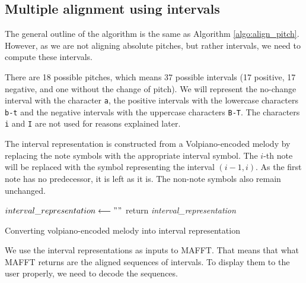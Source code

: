 \subsection{Multiple alignment using intervals}

The general outline of the algorithm is the same as Algorithm \ref{algo:align_pitch}. However, as we are not aligning absolute pitches, but rather intervals,
we need to compute these intervals.

There are 18 possible pitches, which means 37 possible intervals (17 positive, 17 negative, and one without the change of pitch). We will represent the no-change interval
with the character \verb|a|, the positive intervals with the lowercase characters \verb|b-t| and the negative intervals with the uppercase characters \verb|B-T|. The characters
\verb|i| and \verb|I| are not used for reasons explained later.

The interval representation is constructed from a Volpiano-encoded melody by replacing the note symbols with the appropriate interval symbol. The $i$-th note will be
replaced with the symbol representing the interval $(i-1, i)$. As the first note has no predecessor, it is left as it is. The non-note symbols also remain unchanged.\newline

\begin{algorithm}[H]
    \BlankLine
    $interval\_representation \longleftarrow ""$\;
    return \emph{interval\_representation}\;
    \caption{Converting volpiano-encoded melody into interval representation}
    \label{algo:convert_to_interval}
\end{algorithm}

We use the interval representations as inputs to MAFFT. That means that what MAFFT returns are the aligned sequences of intervals. To display them to the user
properly, we need to decode the sequences.\newline

